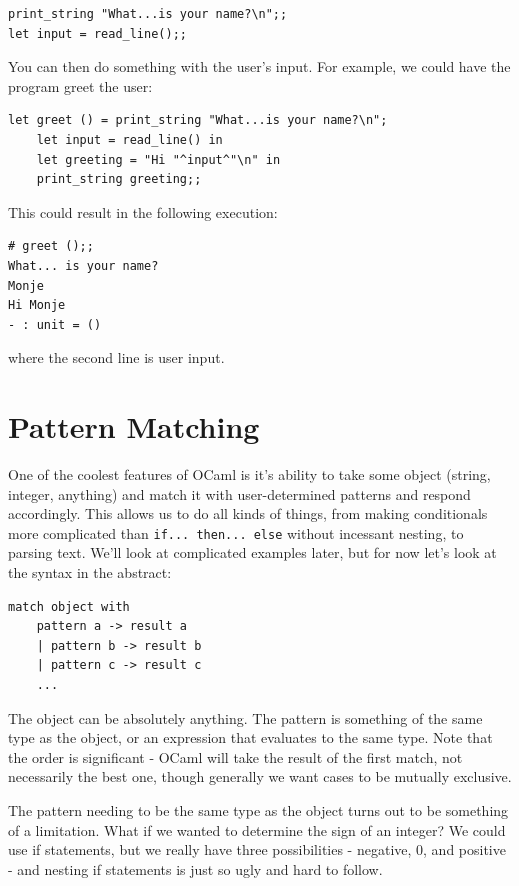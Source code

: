\documentclass[10pt]{book}
\begin{document}

\beforeverb
\begin{verbatim}
print_string "What...is your name?\n";;
let input = read_line();;
\end{verbatim}
\afterverb
%
You can then do something with the user's input. For example, we could have
the program greet the user:

\beforeverb
\begin{verbatim}
let greet () = print_string "What...is your name?\n";
	let input = read_line() in
	let greeting = "Hi "^input^"\n" in
	print_string greeting;;
\end{verbatim}
\afterverb

This could result in the following execution:

\beforeverb
\begin{verbatim}
# greet ();;
What... is your name?
Monje
Hi Monje
- : unit = ()
\end{verbatim}
\afterverb
where the second line is user input.

\section{Pattern Matching}

One of the coolest features of OCaml is it's ability to 
take some object (string, integer, anything) and match 
it with user-determined patterns and respond accordingly. 
This allows us to do all kinds of things, from making 
conditionals more complicated than {\tt if... then... else} 
without incessant nesting, to parsing text. We'll look at 
complicated examples later, but for now let's look at the
syntax in the abstract:

\beforeverb
\begin{verbatim}
match object with
	pattern a -> result a
	| pattern b -> result b
	| pattern c -> result c
	...
\end{verbatim}
\afterverb

The object can be absolutely anything. The pattern is something
of the same type as the object, or an expression that evaluates to 
the same type. Note that the order is significant - OCaml will take 
the result of the first match, not necessarily the best one, though 
generally we want cases to be mutually exclusive.

The pattern needing to be the same type as the object turns out to 
be something of a limitation. What if we wanted to determine the sign 
of an integer? We could use if statements, but we really have three 
possibilities - negative, 0, and positive - and nesting 
if statements is just so ugly and hard to follow.
\end{document}
